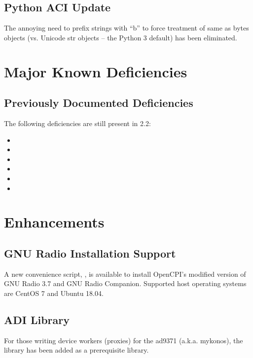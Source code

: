\subsection{Python ACI Update}
\label{sec:22_aci}
The annoying need to prefix strings with ``b'' to force treatment of same as bytes objects (vs. Unicode str objects -- the Python 3 default) has been eliminated.

\section{Major Known Deficiencies}
\label{sec:22_bugs}

\subsection{Previously Documented Deficiencies}
The following deficiencies are still present in 2.2:
\begin{itemize}
\setlength\itemsep{0em} %
\item {}
\item {}
\item {}
\item {}
\item {}
\item {}
\end{itemize}


\beginoldnotes
{}
\def\ocpiversion{v2.1.0}
\section{Enhancements}

\subsection{GNU Radio Installation Support}
\label{sec:21_gnuradio_install}
A new convenience script, , is available to install OpenCPI's modified version of GNU Radio 3.7 and GNU Radio Companion.  Supported host operating systems are CentOS 7 and Ubuntu 18.04.

\subsection{ADI  Library}
\label{sec:21_mykonos_library}
For those writing device workers (proxies) for the ad9371 (a.k.a. mykonos), the  library has been added as a prerequisite library.

